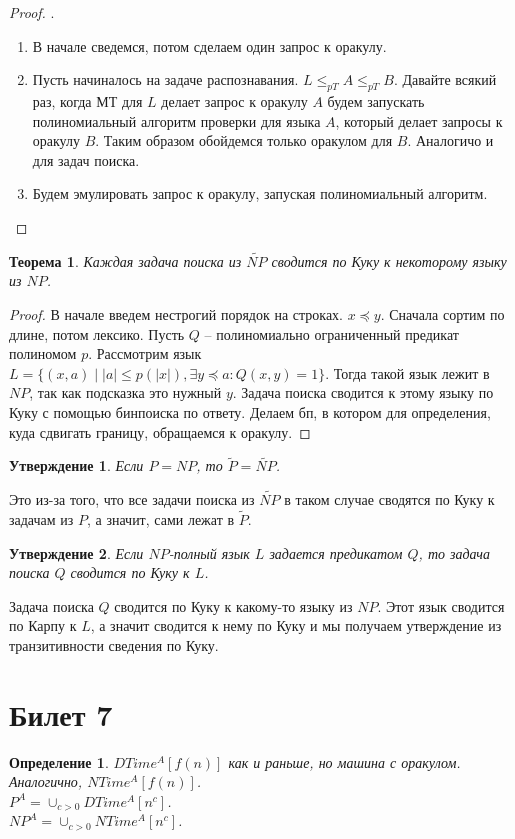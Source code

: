 \documentclass[12pt, letterpaper]{article}
\newtheorem{theorem}{Теорема}[section]
\newtheorem{prop}{Утверждение}[section]
\newtheorem{defi}{Определение}[section]
\begin{document}
\begin{proof}.
\begin{enumerate}
\item В начале сведемся, потом сделаем один запрос к оракулу. 
\item Пусть начиналось на задаче распознавания. $L \leq_{pT} A \leq_{pT} B$. Давайте всякий раз, когда МТ для $L$ делает запрос к оракулу $A$ будем запускать полиномиальный алгоритм проверки для языка $A$, который делает запросы к оракулу $B$. Таким образом обойдемся только оракулом для $B$. Аналогичо и для задач поиска.
\item Будем эмулировать запрос к оракулу, запуская полиномиальный алгоритм.
\end{enumerate}
\end{proof}

\begin{theorem}
Каждая задача поиска из $\widetilde{NP}$ сводится по Куку к некоторому языку из $NP$.
\end{theorem}
\begin{proof}
В начале введем нестрогий порядок на строках. $x \preceq y$. Сначала сортим по длине, потом лексико. Пусть $Q$ -- полиномиально ограниченный предикат полиномом $p$. Рассмотрим язык $L =
\{ (x,a)\;|\;|a|\leq p(|x|), \exists y \preceq a : Q(x, y) = 1 \}$. Тогда такой язык лежит в $NP$, так как подсказка это нужный $y$. Задача поиска сводится к этому языку по Куку с помощью бинпоиска по ответу. Делаем бп, в котором для определения, куда сдвигать границу, обращаемся к оракулу.
\end{proof}

\begin{prop}
Если $P=NP$, то $\widetilde{P} = \widetilde{NP}$.
\end{prop}
Это из-за того, что все задачи поиска из $\widetilde{NP}$ в таком случае сводятся по Куку к задачам из $P$, а значит, сами лежат в $\widetilde{P}$.

\begin{prop}
Если $NP$-полный язык $L$ задается предикатом $Q$, то задача поиска $Q$ сводится по Куку к $L$.
\end{prop}
Задача поиска $Q$ сводится по Куку к какому-то языку из $NP$. Этот язык сводится по Карпу к $L$, а значит сводится к нему по Куку и мы получаем утверждение из транзитивности сведения по Куку.

\section{Билет 7}
\begin{defi}
$DTime^A[f(n)]$ как и раньше, но машина с оракулом. Аналогично, $NTime^A[f(n)]$.\\
$P^A = \cup_{c>0} DTime^A[n^c]$.\\
$NP^A = \cup_{c>0} NTime^A[n^c]$.\\
\end{defi}
\end{document}
